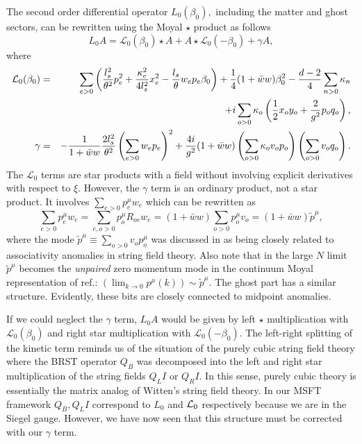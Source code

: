 \documentclass[a4paper,11pt]{article}
\begin{document}
The second order differential operator $L_{0}\left( \beta _{0}\right) ,$
including the matter and ghost sectors, can be rewritten using the Moyal $%
\star $ product as follows
\begin{equation*}
L_{0}A=\mathcal{L}_{0}(\beta _{0})\star A+A\star \mathcal{L}_{0}(-\beta
_{0})+\gamma A,
\end{equation*}%
where%
\begin{eqnarray}
\mathcal{L}_{0}(\beta _{0}) &=&\sum_{e>0}\left( {\frac{l_{s}^{2}}{\theta ^{2}%
}}p_{e}^{2}+{\frac{\kappa _{e}^{2}}{4l_{s}^{2}}}x_{e}^{2}-{\frac{l_{s}}{%
\theta }}w_{e}p_{e}\beta _{0}\right) +{\frac{1}{4}}(1+\bar{w}w)\beta
_{0}^{2}-{\frac{d-2}{4}}\sum_{n>0}\kappa _{n}  \notag \\
&&+i\sum_{o>0}\kappa _{o}\left( \frac{1}{2}x_{o}y_{o}+{\frac{2}{g^{2}}}p_{o}q_{o}\right) , \\
\gamma &=&-{\frac{1}{1+\bar{w}w}}{\frac{2l_{s}^{2}}{\theta ^{2}}}\left(
\sum_{e>0}w_{e}p_{e}\right) ^{2}+{\frac{4i}{g^{2}}}(1+\bar{w}w)\left(
\sum_{o>0}\kappa _{o}v_{o}p_{o}\right) \left( \sum_{o>0}v_{o}q_{o}\right) .
\end{eqnarray}%
The $\mathcal{L}_{0}$ terms are star products with a field without involving
explicit derivatives with respect to $\xi .$ However, the $\gamma $ term is
an ordinary product, not a star product. It involves $\sum_{e>0}p_{e}^{\mu
}w_{e}$ which can be rewritten as%
\begin{equation}
\sum_{e>0}p_{e}^{\mu }w_{e}=\sum_{e,o>0}p_{o}^{\mu }R_{oe}w_{e}=\left( 1+%
\bar{w}w\right) \sum_{o>0}p_{o}^{\mu }v_{o}=\left( 1+\bar{w}w\right) \tilde{p%
}^{\mu },
\end{equation}%
where the mode $\tilde{p}^{\mu }\equiv \sum_{o>0}v_{o}p_{o}^{\mu }$ was
discussed in \cite{BM1} as being closely related to associativity anomalies
in string field theory. Also note that in the large $N$ limit $\tilde{p}%
^{\mu }$ becomes the \textit{unpaired} zero momentum mode in the continuum
Moyal representation of ref.\cite{DLMZ}: $\left( \lim_{k\rightarrow 0}p^{\mu
}\left( k\right) \right) \sim \tilde{p}^{\mu }.$ The ghost part has a
similar structure. Evidently, these bits are closely connected to midpoint
anomalies.

If we could neglect the $\gamma $ term, $L_{0}A$ would be given by
left $\star $ multiplication with $\mathcal{L}_{0}(\beta _{0})$
and right star multiplication with $\mathcal{L}_{0}(-\beta _{0})$.
The left-right splitting of the kinetic term reminds us of the
situation of the purely cubic string field theory \cite{PSFT}
where the BRST operator $Q_B$ was decomposed into the left and
right star multiplication of the string fields $Q_L I$ or $Q_R I$.
In this sense, purely cubic theory
 is essentially the matrix analog of Witten's string
field theory. In our MSFT framework $Q_B,Q_L I$ correspond to
$L_0$ and ${\cal L}_0$ respectively because we are in the Siegel
gauge. However, we have now seen that this structure must be
corrected with our $\gamma$ term.
\end{document}
